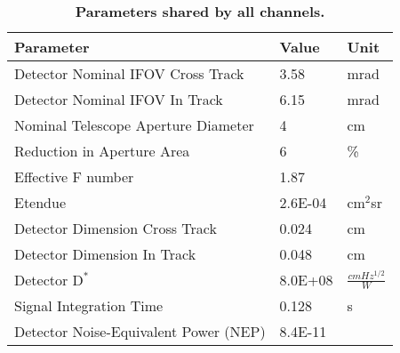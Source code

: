 \begin{table}
\label{tab:parameters_shared}
\begin{tabular}{lll}
\textbf{Parameter} & \textbf{Value} & \textbf{Unit}\\
\hline
Detector Nominal IFOV Cross Track & 3.58 & mrad \\
Detector Nominal IFOV In Track & 6.15 & mrad \\
Nominal Telescope Aperture Diameter & 4 & cm\\
Reduction in Aperture Area & 6 & \% \\
Effective F number & 1.87 & \\
Etendue & 2.6E-04 & cm$^2$sr \\
Detector Dimension Cross Track & 0.024 & cm \\
Detector Dimension In Track & 0.048 & cm \\
Detector $\mathrm{D^*}$ & 8.0E+08 & $\frac{cmHz^{1/2}}{W}$ \\
Signal Integration Time & 0.128 & s \\
Detector Noise-Equivalent Power (NEP) & 8.4E-11 & \\
\hline
\end{tabular}
\caption{\textbf{Parameters shared by all channels.}}
\end{table}



